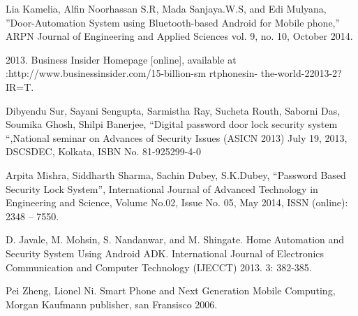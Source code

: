 \documentclass[options]{article}
\begin{document}
\begin{thebibliography}{9}

Lia Kamelia, Alfin Noorhassan S.R, Mada Sanjaya.W.S, and Edi Mulyana, ”Door-Automation System
using Bluetooth-based Android for Mobile phone,” ARPN Journal of Engineering and Applied
Sciences vol. 9, no. 10, October 2014.

2013. Business Insider Homepage [online], available at :http://www.businessinsider.com/15-billion-sm
rtphonesin- the-world-22013-2?IR=T.
 

Dibyendu Sur, Sayani Sengupta, Sarmistha Ray, Sucheta Routh, Saborni Das, Soumika Ghosh, Shilpi
Banerjee, “Digital password door lock security system “,National seminar on Advances of Security
Issues (ASICN 2013) July 19, 2013, DSCSDEC, Kolkata, ISBN No. 81-925299-4-0



Arpita Mishra, Siddharth Sharma, Sachin Dubey, S.K.Dubey, “Password Based Security Lock
System”, International Journal of Advanced Technology in Engineering and Science, Volume No.02,
Issue No. 05, May 2014, ISSN (online): 2348 – 7550.


D. Javale, M. Mohsin, S. Nandanwar, and M. Shingate. Home Automation and Security System Using
Android ADK. International Journal of Electronics Communication and Computer Technology
(IJECCT) 2013. 3: 382-385.


Pei Zheng, Lionel Ni. Smart Phone and Next Generation Mobile Computing, Morgan Kaufmann
publisher, san Fransisco 2006.



\end{thebibliography}
\end{document}
